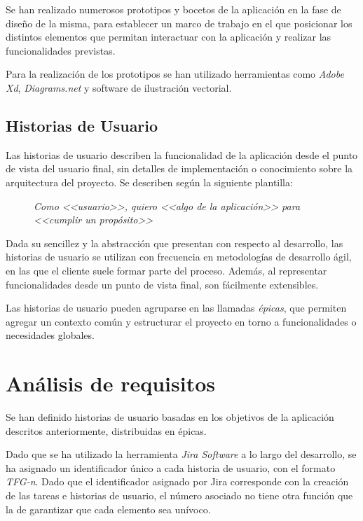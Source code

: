\documentclass[10pt, a4paper]{aqademic}
\begin{document}
Se han realizado numerosos prototipos y bocetos de la aplicación en la fase de diseño de la misma, para establecer un marco de trabajo en el que posicionar los 
distintos elementos que permitan interactuar con la aplicación y realizar las funcionalidades previstas.

Para la realización de los prototipos se han utilizado herramientas como \textit{Adobe Xd}, \textit{Diagrams.net} y software de ilustración vectorial.


\subsection*{Historias de Usuario}

Las historias de usuario describen la funcionalidad de la aplicación desde el punto de vista del usuario final, sin detalles de implementación o conocimiento sobre la arquitectura del proyecto. Se describen según la siguiente plantilla:

\medskip

\begin{figure}[h]
	\centering
	\textit{Como <<usuario>>, quiero <<algo de la aplicación>> para <<cumplir un propósito>>}
\end{figure}

Dada su sencillez y la abstracción que presentan con respecto al desarrollo, las historias de usuario se utilizan con frecuencia en metodologías de desarrollo ágil, en las que el cliente suele formar parte del proceso. Además, al representar funcionalidades desde un punto de vista final, son fácilmente extensibles.

Las historias de usuario pueden agruparse en las llamadas \textit{épicas}, que permiten agregar un contexto común y estructurar el proyecto en torno a funcionalidades o necesidades globales.


\section{Análisis de requisitos}

Se han definido historias de usuario basadas en los objetivos de la aplicación descritos anteriormente, distribuidas en épicas.

Dado que se ha utilizado la herramienta \textit{Jira Software} a lo largo del desarrollo, se ha asignado un identificador único a cada historia de usuario, con el formato \textit{TFG-n}. Dado que el identificador asignado por Jira corresponde con la creación de las tareas e historias de usuario, el número asociado no tiene otra función que la de garantizar que cada elemento sea unívoco.
\end{document}
